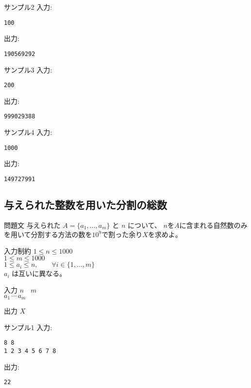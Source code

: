 \documentclass[a4paper,twoside,onecolumn,openany,article,10pt]{memoir}
\theoremstyle{remark}
\begin{document}
\begin{itembox}[l]{サンプル2}
入力:
\begin{verbatim}
100
\end{verbatim}
出力:
\begin{verbatim}
190569292
\end{verbatim}
\end{itembox}

\begin{itembox}[l]{サンプル3}
入力:
\begin{verbatim}
200
\end{verbatim}
出力:
\begin{verbatim}
999029388
\end{verbatim}
\end{itembox}

\begin{itembox}[l]{サンプル4}
入力:
\begin{verbatim}
1000
\end{verbatim}
出力:
\begin{verbatim}
149727991
\end{verbatim}
\end{itembox}

\clearpage
\subsection{与えられた整数を用いた分割の総数}
\begin{itembox}[l]{問題文}
与えられた $A=\{a_1,\dotsc,a_m\}$ と $n$ について、
$n$を$A$に含まれる自然数のみを用いて分割する方法の数を$10^9$で割った余り$X$を求めよ。
\end{itembox}

\begin{itembox}[l]{入力制約}
$1\le n\le 1000$\\
$1\le m\le 1000$\\
$1\le a_i \le n, \qquad\forall i\in\{1,\dotsc,m\}$\\
$a_i$ は互いに異なる。
\end{itembox}

\begin{itembox}[l]{入力}
$n\quad m$\\
$a_1\, \cdots\, a_m$
\end{itembox}

\begin{itembox}[l]{出力}
$X$
\end{itembox}

\begin{itembox}[l]{サンプル1}
入力:
\begin{verbatim}
8 8
1 2 3 4 5 6 7 8
\end{verbatim}
出力:
\begin{verbatim}
22
\end{verbatim}
\end{itembox}
\end{document}
